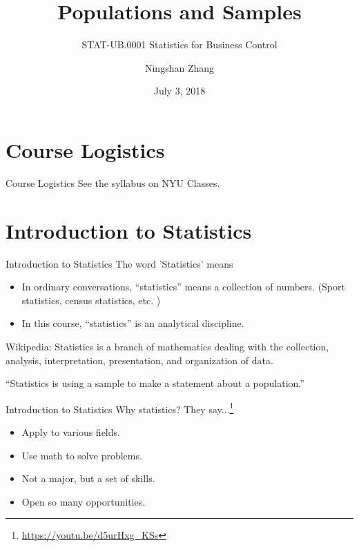 \documentclass{beamer}
\title{Populations and Samples}
\subtitle{STAT-UB.0001 Statistics for Business Control}
\author{Ningshan Zhang}
\institute[New York University] %
{
  IOMS Department\\
  nzhang@stern.nyu.edu
}
\date{July 3, 2018}
\begin{document}
\begin{frame}
  \titlepage
\end{frame}



\section{Course Logistics}

\begin{frame}{Course Logistics}
See the syllabus on NYU Classes.
\end{frame}

\section{Introduction to Statistics}

\begin{frame}{Introduction to Statistics}
The word 'Statistics' means
\begin{itemize}
\item In ordinary conversations, ``statistics'' means a collection of numbers. (Sport statistics, census statistics, etc. )
\item In this course, ``statistics'' is an analytical discipline. 
\end{itemize}

Wikipedia: Statistics is a branch of mathematics dealing with the collection, analysis, interpretation, presentation, and organization of data. 

``Statistics is using a \alert{sample} to make a statement about a \alert{population}.''
\end{frame}

\begin{frame}{Introduction to Statistics}
Why statistics? They say...\footnote{\url{https://youtu.be/d5urHxg_KSs}}
\begin{itemize}
\item Apply to various fields.
\item Use math to solve problems.
\item Not a major, but a set of skills.
\item Open so many opportunities.
\end{itemize}
\end{frame}
\end{document}
